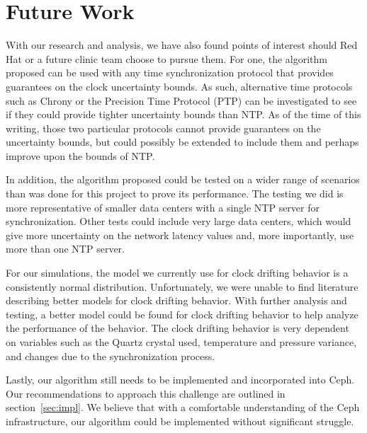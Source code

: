 \chapter{Future Work}
\label{sec:future}

With our research and analysis, we have also found points of interest
should Red Hat or a future clinic team choose to pursue them. For one,
the algorithm proposed can be used with any time synchronization
protocol that provides guarantees on the clock uncertainty bounds. As
such, alternative time protocols such as Chrony or the Precision Time
Protocol (PTP) can be investigated to see if they could provide
tighter uncertainty bounds than NTP. As of the time of this writing,
those two particular protocols cannot provide guarantees on the
uncertainty bounds, but could possibly be extended to include them and
perhaps improve upon the bounds of NTP.

In addition, the algorithm proposed could be tested on a wider range
of scenarios than was done for this project to prove its
performance. The testing we did is more representative of smaller data
centers with a single NTP server for synchronization. Other tests
could include very large data centers, which would give more
uncertainty on the network latency values and, more importantly, use
more than one NTP server.

For our simulations, the model we currently use for clock drifting
behavior is a consistently normal distribution. Unfortunately, we were
unable to find literature describing better models for clock drifting
behavior. With further analysis and testing, a better model could be
found for clock drifting behavior to help analyze the performance of
the behavior. The clock drifting behavior is very dependent on
variables such as the Quartz crystal used, temperature and pressure
variance, and changes due to the synchronization process.



Lastly, our algorithm still needs to be implemented and incorporated
into Ceph. Our recommendations to approach this challenge are outlined
in section~\ref{sec:impl}. We believe that with a comfortable
understanding of the Ceph infrastructure, our algorithm could be
implemented without significant struggle.
